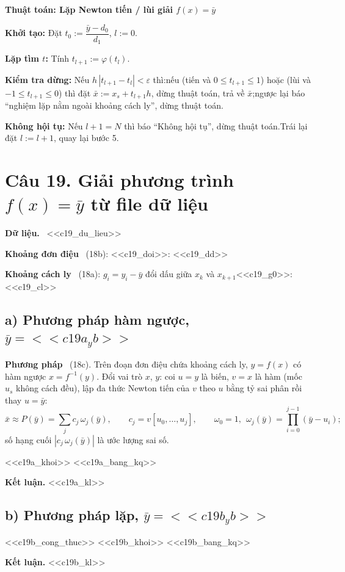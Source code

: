 \documentclass[11pt,a4paper]{article}
\newenvironment{ketluan}
  {\par\medskip\noindent\begin{lrbox}{\klbox}\begin{minipage}{\dimexpr\linewidth-12pt\relax}\textbf{Kết luận. }}
  {\end{minipage}\end{lrbox}\setlength{\fboxsep}{5pt}\fbox{\usebox{\klbox}}\par\medskip}
\newenvironment{thuattoan}[1]
  {\par\medskip\noindent\textbf{Thuật toán: #1}\begin{description}[style=standard,align=left,leftmargin=4.3em,labelwidth=3.9em,labelsep=0.4em,itemsep=1pt,topsep=3pt,font=\normalfont\bfseries]}
  {\end{description}}
\newcommand{\pp}[1]{\par\smallskip\noindent\textbf{#1}\ }
\newcommand{\thut}{\newline\hspace*{1.2em}}
\begin{document}
\begin{thuattoan}{Lặp Newton tiến / lùi giải $f(x)=\bar y$}
\item[Bước 4:] \textbf{Khởi tạo:} Đặt $t_0:=\dfrac{\bar y-d_0}{d_1}$, $l:=0$.
\item[Bước 5:] \textbf{Lặp tìm $t$:} Tính $t_{l+1}:=\varphi(t_l)$.
\item[Bước 6:] \textbf{Kiểm tra dừng:} Nếu $h\,|t_{l+1}-t_l|<\varepsilon$ thì:\thut nếu (tiến và $0\le t_{l+1}\le1$) hoặc (lùi và $-1\le t_{l+1}\le0$) thì đặt $\bar x:=x_s+t_{l+1}h$, dừng thuật toán, trả về $\bar x$;\thut ngược lại báo ``nghiệm lặp nằm ngoài khoảng cách ly'', dừng thuật toán.
\item[Bước 7:] \textbf{Không hội tụ:} Nếu $l+1=N$ thì báo ``Không hội tụ'', dừng thuật toán.\newline Trái lại đặt $l:=l+1$, quay lại bước 5.
\end{thuattoan}

\section{Câu 19. Giải phương trình $f(x)=\bar y$ từ file dữ liệu}

\pp{Dữ liệu.} <<c19_du_lieu>>

\pp{Khoảng đơn điệu} (18b): <<c19_doi>>:
<<c19_dd>>
\pp{Khoảng cách ly} (18a): $g_i=y_i-\bar y$ đổi dấu giữa $x_k$ và $x_{k+1}$<<c19_g0>>:
<<c19_cl>>

\subsection{a) Phương pháp hàm ngược, $\bar y=<<c19a_yb>>$}
\pp{Phương pháp} (18c). Trên đoạn đơn điệu chứa khoảng cách ly, $y=f(x)$ có hàm ngược $x=f^{-1}(y)$. Đổi vai trò $x$, $y$: coi $u=y$ là biến, $v=x$ là hàm (mốc $u_s$ không cách đều), lập đa thức Newton tiến của $v$ theo $u$ bằng tỷ sai phân rồi thay $u=\bar y$:
\[ \bar x\approx P(\bar y)=\sum_{j}c_j\,\omega_j(\bar y),\qquad c_j=v[u_0,\dots,u_j],\qquad \omega_0=1,\ \ \omega_j(\bar y)=\prod_{i=0}^{j-1}(\bar y-u_i); \]
số hạng cuối $|c_j\,\omega_j(\bar y)|$ là ước lượng sai số.

<<c19a_khoi>>
<<c19a_bang_kq>>
\begin{ketluan}
<<c19a_kl>>
\end{ketluan}

\subsection{b) Phương pháp lặp, $\bar y=<<c19b_yb>>$}
<<c19b_cong_thuc>>
<<c19b_khoi>>
<<c19b_bang_kq>>
\begin{ketluan}
<<c19b_kl>>
\end{ketluan}
\end{document}

